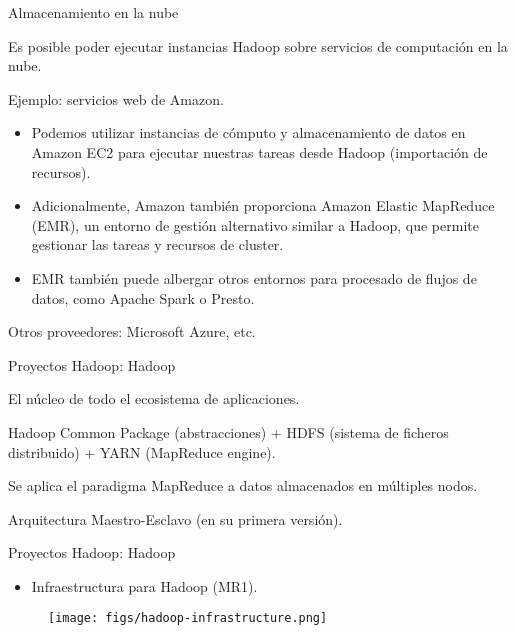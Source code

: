 
\begin{frame}{Almacenamiento en la nube}
 \begin{wideitemize}
  \item Es posible poder ejecutar instancias Hadoop sobre servicios de computación
  en la nube.
  \item Ejemplo: servicios web de Amazon.
  \begin{itemize}
   \item Podemos utilizar instancias de cómputo y almacenamiento de datos en Amazon
   EC2 para ejecutar nuestras tareas desde Hadoop (importación de recursos).
   \item Adicionalmente, Amazon también proporciona Amazon Elastic MapReduce (EMR), un
   entorno de gestión alternativo similar a Hadoop, que permite gestionar las tareas
   y recursos de cluster.
   \item EMR también puede albergar otros entornos para procesado de flujos de datos,
   como Apache Spark o Presto.
  \end{itemize}
  
  \item Otros proveedores: Microsoft Azure, etc.

 \end{wideitemize}

\end{frame}


\begin{frame}{Proyectos Hadoop: Hadoop}
 \begin{wideitemize}
  \item El núcleo de todo el ecosistema de aplicaciones.
  \item Hadoop Common Package (abstracciones) + HDFS (sistema de ficheros distribuido) +
  YARN (MapReduce engine).
  \item Se aplica el paradigma MapReduce a datos almacenados en múltiples nodos.
  \item Arquitectura Maestro-Esclavo (en su primera versión).
 \end{wideitemize}

\end{frame}


\begin{frame}{Proyectos Hadoop: Hadoop}
\begin{itemize}
 \item Infraestructura para Hadoop (MR1).
\end{itemize}

\begin{figure}
 \centering
 \texttt{[image: figs/hadoop-infrastructure.png]}
\end{figure}

\end{frame}

